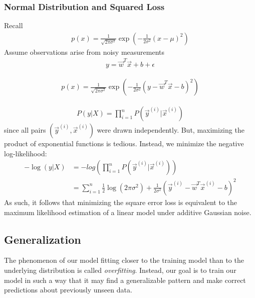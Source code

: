 \documentclass[a4paper,12pt]{article}
\theoremstyle{definition}
\begin{document}
    \subsubsection*{Normal Distribution and Squared Loss}
    Recall
    \begin{equation*}
        \begin{aligned}
            p(x) = \frac{1}{\sqrt{2\pi\sigma^2}}\exp({-\frac{1}{2\sigma^2}(x-\mu)^2})
        \end{aligned}
    \end{equation*}
    Assume observations arise from noisy measurements
    \begin{equation*}
        \begin{aligned}
            y = \vec{w}^T\vec{x} + b + \epsilon
        \end{aligned}
    \end{equation*}

    \begin{equation*}
        \begin{aligned}
            p(x) = \frac{1}{\sqrt{2\pi\sigma^2}}\exp({-\frac{1}{2\sigma^2}(y - \vec{w}^T\vec{x} - b)^2})
        \end{aligned}
    \end{equation*}

    \begin{equation*}
        \begin{aligned}
            P(y|X) = \prod_{i=1}^{n}P(\vec{y}^{(i)}|\vec{x}^{(i)})
        \end{aligned}
    \end{equation*}
    since all pairs $(\vec{y}^{(i)},\vec{x}^{(i)})$ were drawn independently. But, maximizing the product of exponential
    functions is tedious. Instead, we minimize the negative log-likelihood:
    \begin{equation*}
        \begin{aligned}
            -\log(y|X) &= -log(\prod_{i=1}^{n}P(\vec{y}^{(i)}|\vec{x}^{(i)})) \\
                       &= \sum_{i=1}^{n} \frac{1}{2}\log(2\pi\sigma^2) + \frac{1}{2\sigma^2}(\vec{y}^{(i)}-\vec{w}^T\vec{x}^{(i)} - b)^2
        \end{aligned}
    \end{equation*}
    As such, it follows that minimizing the square error loss is equivalent to the maximum likelihood estimation of a linear model 
    under additive Gaussian noise.

\subsection*{Generalization}
    The phenomenon of our model fitting closer to the training model than to the underlying distribution is called \textit{overfitting}.
    Instead, our goal is to train our model in such a way that it may find a generalizable pattern and make correct
    predictions about previously unseen data.
\end{document}
